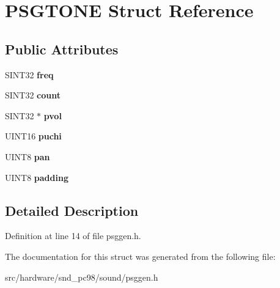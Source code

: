 \hypertarget{structPSGTONE}{\section{P\-S\-G\-T\-O\-N\-E Struct Reference}
\label{structPSGTONE}
}
\subsection*{Public Attributes}
\begin{DoxyCompactItemize}
\item 
\hypertarget{structPSGTONE_a5a0c0b7c389439f7377421ef4e1564b0}{S\-I\-N\-T32 {\bfseries freq}}\label{structPSGTONE_a5a0c0b7c389439f7377421ef4e1564b0}

\item 
\hypertarget{structPSGTONE_a788a0b34b9c067bfde949d81409c8d76}{S\-I\-N\-T32 {\bfseries count}}\label{structPSGTONE_a788a0b34b9c067bfde949d81409c8d76}

\item 
\hypertarget{structPSGTONE_af894d439a43368680af93dab2d0b6a46}{S\-I\-N\-T32 $\ast$ {\bfseries pvol}}\label{structPSGTONE_af894d439a43368680af93dab2d0b6a46}

\item 
\hypertarget{structPSGTONE_a0778821c351c747cfaf87f1e65679d70}{U\-I\-N\-T16 {\bfseries puchi}}\label{structPSGTONE_a0778821c351c747cfaf87f1e65679d70}

\item 
\hypertarget{structPSGTONE_a2aaea78d90331fbbad4742d861eba73a}{U\-I\-N\-T8 {\bfseries pan}}\label{structPSGTONE_a2aaea78d90331fbbad4742d861eba73a}

\item 
\hypertarget{structPSGTONE_aeb8b2210fec8a081119d792eeb45c661}{U\-I\-N\-T8 {\bfseries padding}}\label{structPSGTONE_aeb8b2210fec8a081119d792eeb45c661}

\end{DoxyCompactItemize}


\subsection{Detailed Description}


Definition at line 14 of file psggen.\-h.



The documentation for this struct was generated from the following file\-:\begin{DoxyCompactItemize}
\item 
src/hardware/snd\-\_\-pc98/sound/psggen.\-h\end{DoxyCompactItemize}
